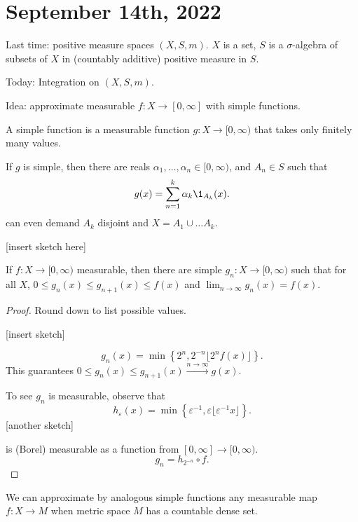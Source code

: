 \section{September 14th, 2022}

Last time: positive measure spaces $(X, S, m)$. $X$ is a set, $S$ is a $\sigma$-algebra of subsets of $X$ in (countably additive) positive measure in $S$.

Today: Integration on $(X, S, m)$.

Idea: approximate measurable $f : X \to [0, \infty]$ with simple functions.

\begin{definition}
	A simple function is a measurable function $g : X \to [0, \infty)$ that takes only finitely many values.
\end{definition}

If $g$ is simple, then there are reals $\alpha_1, \ldots, \alpha_n \in [0, \infty)$, and $A_n \in S$ such that
\[
	g(x) = \sum_{n = 1}^{k} \alpha_k \1_{A_k}(x).
\]
can even demand $A_k$ disjoint and $X = A_1 \cup \ldots A_k$.

[insert sketch here]

\begin{theorem}
	If $f : X \to [0, \infty)$ measurable, then there are simple $g_n : X \to [0, \infty)$ such that for all $X$, $0 \leq g_n(x) \leq g_{n+1}(x) \leq f(x)$ and $\lim_{n \to \infty} g_n(x) = f(x)$.
\end{theorem}

\begin{proof}
  Round down to list possible values.

	[insert sketch]

	\[
		g_n(x) = \min \left\{2^n, 2^{-n} \lfloor 2^n f(x) \rfloor \right\}.
	\]
	This guarantees $0 \leq g_n(x) \leq g_{n+1}(x) \xrightarrow{n \to \infty} g(x)$.

	To see $g_n$ is measurable, observe that
	\[
		h_\varepsilon (x) = \min \left\{\varepsilon^{-1}, \varepsilon \lfloor \varepsilon^{-1} x \rfloor\right\}.
	\]
	[another sketch]

	is (Borel) measurable as a function from $[0, \infty] \to [0, \infty)$.
	\[
		g_n = h_{2^{-n}} \circ f.
	\]
\end{proof}

\begin{remark}
  We can approximate by analogous simple functions any measurable map $f : X \to M$ when metric space $M$ has a countable dense set.
\end{remark}

